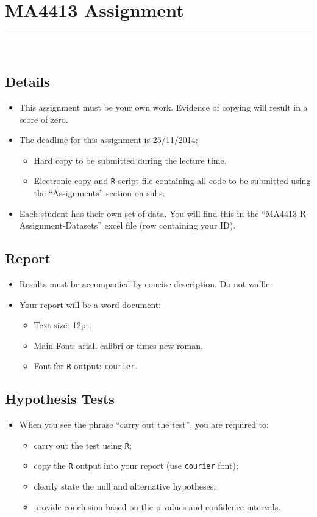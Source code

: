 \documentclass[12pt]{article}
\begin{document}
\section*{MA4413 Assignment }
\noindent\rule{\linewidth}{1pt}
\quad\\[-0.5cm]

\subsection*{Details}
\begin{itemize}
\item This assignment must be your own work. Evidence of copying will result in a score of zero.
\item The deadline for this assignment is 25/11/2014:
\begin{itemize}
\item Hard copy to be submitted during the lecture time.
\item Electronic copy and \texttt{R} script file containing all code to be submitted using the ``Assignments'' section on sulis.
\end{itemize}
\item Each student has their own set of data. You will find this in the \mbox{``MA4413-R-Assignment-Datasets''} excel file (row containing your ID).
\end{itemize}
\subsection*{Report}
\begin{itemize}
\item Results must be accompanied by concise description. Do not waffle.
\item Your report will be a word document:
\begin{itemize}
\item Text size: 12pt.
\item Main Font: arial, calibri or times new roman.
\item Font for \texttt{R} output: \texttt{courier}.
\end{itemize}
\end{itemize}
\subsection*{Hypothesis Tests}
\begin{itemize}
\item When you see the phrase ``carry out the test'', you are required to:
\begin{itemize}
\item carry out the test using \texttt{R};
\item copy the \texttt{R} output into your report (use \texttt{courier} font);
\item clearly state the null and alternative hypotheses;
\item provide conclusion based on the p-values and confidence intervals.
\end{itemize}
\end{itemize}
\end{document}
